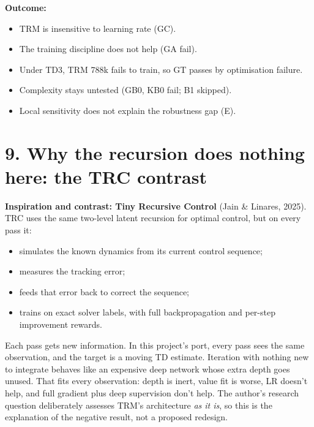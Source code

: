 \documentclass[11pt]{article}
\begin{document}
\textbf{Outcome:}

\begin{itemize}
\item TRM is insensitive to learning rate (GC).
\item The training discipline does not help (GA fail).
\item Under TD3, TRM 788k fails to train, so GT passes by optimisation failure.
\item Complexity stays untested (GB0, KB0 fail; B1 skipped).
\item Local sensitivity does not explain the robustness gap (E).
\end{itemize}



\section*{9. Why the recursion does nothing here: the TRC contrast}



\textbf{Inspiration and contrast: Tiny Recursive Control} (Jain \& Linares, 2025). TRC uses the same two-level latent recursion for optimal control, but on every pass it:

\begin{itemize}
\item simulates the known dynamics from its current control sequence;
\item measures the tracking error;
\item feeds that error back to correct the sequence;
\item trains on exact solver labels, with full backpropagation and per-step improvement rewards.
\end{itemize}



Each pass gets new information. In this project's port, every pass sees the same observation, and the target is a moving TD estimate. Iteration with nothing new to integrate behaves like an expensive deep network whose extra depth goes unused. That fits every observation: depth is inert, value fit is worse, LR doesn't help, and full gradient plus deep supervision don't help. The author's research question deliberately assesses TRM's architecture \emph{as it is}, so this is the explanation of the negative result, not a proposed redesign.
\end{document}
